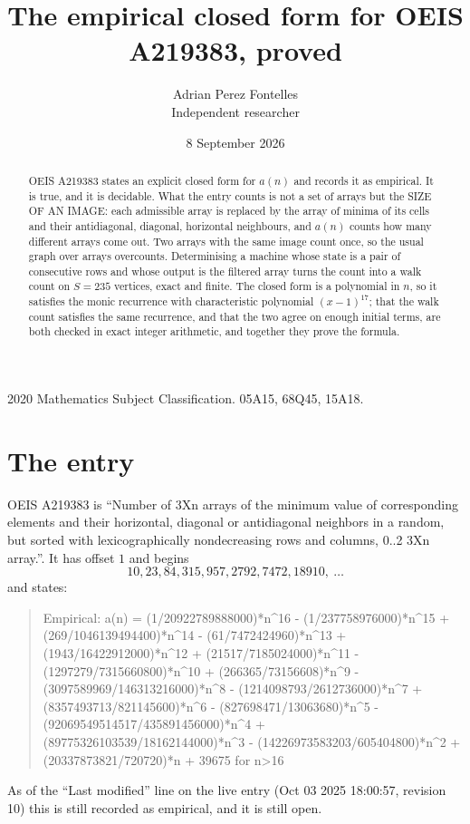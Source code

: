 \documentclass[11pt,a4paper]{article}
\title{The empirical closed form for OEIS A219383, proved}
\author{Adrian Perez Fontelles\\ \small Independent researcher}
\date{8 September 2026}
\theoremstyle{plain}
\theoremstyle{definition}
\begin{document}
\maketitle

\begin{abstract}
OEIS A219383 states an explicit closed form for $a(n)$ and records it as empirical. It is true, and
it is decidable. What the entry counts is not a set of arrays but the SIZE OF AN IMAGE: each
admissible array is replaced by the array of minima of its cells and their antidiagonal, diagonal, horizontal neighbours,
and $a(n)$ counts how many different arrays come out. Two arrays with the same image count
once, so the usual graph over arrays overcounts. Determinising a machine whose state is a pair
of consecutive rows and whose output is the filtered array turns the count into a walk count on
$S=235$ vertices, exact and finite. The closed form is a polynomial in $n$, so it satisfies the
monic recurrence with characteristic polynomial $(x-1)^{17}$; that the walk count
satisfies the same recurrence, and that the two agree on enough initial terms, are both checked
in exact integer arithmetic, and together they prove the formula.
\end{abstract}

\noindent\small 2020 Mathematics Subject Classification. 05A15, 68Q45, 15A18.\normalsize

\section{The entry}

OEIS A219383 is ``Number of 3Xn arrays of the minimum value of corresponding elements and their horizontal, diagonal or antidiagonal neighbors in a random, but sorted with lexicographically nondecreasing rows and columns, 0..2 3Xn array.''. It has offset $1$ and begins
\[
10, 23, 84, 315, 957, 2792, 7472, 18910,\ \dots
\]
and states:
\begin{quote}
Empirical: a(n) = (1/20922789888000)*n\^{}16 - (1/237758976000)*n\^{}15 + (269/1046139494400)*n\^{}14 - (61/7472424960)*n\^{}13 + (1943/16422912000)*n\^{}12 + (21517/7185024000)*n\^{}11 - (1297279/7315660800)*n\^{}10 + (266365/73156608)*n\^{}9 - (3097589969/146313216000)*n\^{}8 - (1214098793/2612736000)*n\^{}7 + (8357493713/821145600)*n\^{}6 - (827698471/13063680)*n\^{}5 - (92069549514517/435891456000)*n\^{}4 + (89775326103539/18162144000)*n\^{}3 - (14226973583203/605404800)*n\^{}2 + (20337873821/720720)*n + 39675 for n>16
\end{quote}
As of the ``Last modified'' line on the live entry (Oct 03 2025 18:00:57, revision 10)
this is still recorded as empirical, and it is still open.
\end{document}
